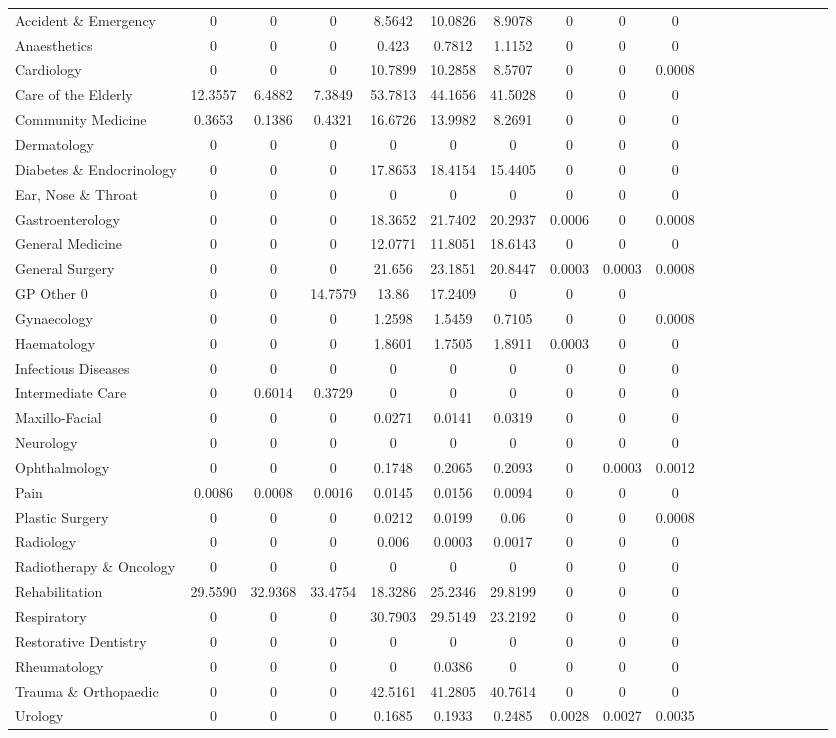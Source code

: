 \documentclass[../thesis.tex]{subfiles}
\begin{document}
\begin{landscape}
\begin{table}[h! ]
{\begin{tabular}{lcccccccccccccccccc}
Accident \& Emergency&0	&0&	0	&8.5642	&10.0826	&8.9078&	0	&0	&0\\
Anaesthetics&0	&0&	0&	0.423&	0.7812	&1.1152&	0&	0&0\\
Cardiology&0	&0&	0&	10.7899	&10.2858&	8.5707	&0&	0&	0.0008\\
Care of the Elderly&12.3557	&6.4882&	7.3849	&53.7813&44.1656	&41.5028&	0&	0	&0\\
Community Medicine	&0.3653	&0.1386&	0.4321	&16.6726	&13.9982&	8.2691	&0&	0&	0\\
Dermatology	&0&	0	&0&	0&	0&	0	&0&0	&0\\
Diabetes \& Endocrinology	&0&	0	&0	&17.8653	&18.4154&	15.4405&	0&	0	&0\\
Ear, Nose \& Throat&0	&0&	0	&0	&0	&0	&0	&0	&0\\
Gastroenterology&0	&0	&0	&18.3652&	21.7402	&20.2937&	0.0006	&0	&0.0008\\
General Medicine&0	&0	&0	&12.0771	&11.8051	&18.6143&	0&	0&	0\\
General Surgery	&0&	0	&0	&21.656	&23.1851	&20.8447&	0.0003	&0.0003&	0.0008\\
GP Other	0	&0	&0&	14.7579&	13.86&	17.2409&	0	&0	&0\\
Gynaecology	&0	&0	&0	&1.2598&	1.5459&	0.7105	&0&	0&	0.0008\\
Haematology	&0	&0	&0	&1.8601	&1.7505&	1.8911	&0.0003&	0	&0\\
Infectious Diseases	&0	&0	&0	&0	&0	&0&	0&	0	&0\\
Intermediate Care&	0	&0.6014&	0.3729&	0&	0&	0&	0	&0&	0\\
Maxillo-Facial	&0	&0	&0&	0.0271&	0.0141	&0.0319	&0	&0	&0\\
Neurology	&0	&0	&0	&0&	0	&0	&0	&0	&0\\
Ophthalmology &0	&0	&0	&0.1748&	0.2065	&0.2093	&0	&0.0003	&0.0012\\
Pain &0.0086	&0.0008&	0.0016	&0.0145	&0.0156	&0.0094	&0&	0	&0\\
Plastic Surgery&	0	&0&	0	&0.0212&	0.0199	&0.06&	0	&0&	0.0008\\
Radiology&0	&0	&0	&0.006	&0.0003	&0.0017&	0&	0&	0\\
 Radiotherapy \& Oncology&	0&	0	&0&	0&	0&	0&	0&	0	&0\\
Rehabilitation&29.5590	&32.9368&	33.4754	&18.3286	&25.2346	&29.8199&	0&	0&	0\\
Respiratory&	0	&0	&0&	30.7903&29.5149	&23.2192	&0&	0	&0\\
Restorative Dentistry	&0&	0	&0	&0&	0&	0&	0&	0&	0\\
Rheumatology&0&	0&	0	&0	&0.0386&	0	&0	&0	&0\\
Trauma \& Orthopaedic&0	&0&	0	&42.5161	&41.2805&	40.7614&	0&	0&	0\\
Urology&0	&0&	0&	0.1685&	0.1933&	0.2485	&0.0028	&0.0027&	0.0035\\ \bottomrule


\end{tabular}}
\end{table}
\end{landscape}
\end{document}
